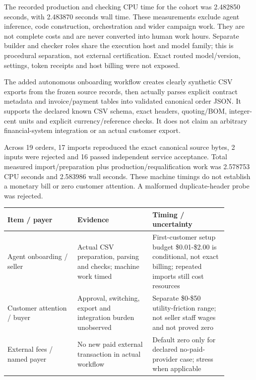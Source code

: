 \documentclass[10pt,letterpaper]{article}
\begin{document}
The recorded production and checking CPU time for the cohort was 2.482850 seconds, with 2.483870 seconds wall time. These measurements exclude agent inference, code construction, orchestration and wider campaign work. They are not complete costs and are never converted into human work hours. Separate builder and checker roles share the execution host and model family; this is procedural separation, not external certification. Exact routed model/version, settings, token receipts and host billing were not exposed.

The added autonomous onboarding workflow creates clearly synthetic CSV exports from the frozen source records, then actually parses explicit contract metadata and invoice/payment tables into validated canonical order JSON. It supports the declared known CSV schema, exact headers, quoting/BOM, integer-cent units and explicit currency/reference checks. It does not claim an arbitrary financial-system integration or an actual customer export.

Across 19 orders, 17 imports reproduced the exact canonical source bytes, 2 inputs were rejected and 16 passed independent service acceptance. Total measured import/preparation plus production/requalification work was 2.578753 CPU seconds and 2.583986 wall seconds. These machine timings do not establish a monetary bill or zero customer attention. A malformed duplicate-header probe was rejected.

\begin{longtable}{>{\raggedright\arraybackslash}p{0.280\linewidth}>{\raggedright\arraybackslash}p{0.300\linewidth}>{\raggedright\arraybackslash}p{0.300\linewidth}}
\toprule
\textbf{Item / payer} & \textbf{Evidence} & \textbf{Timing / uncertainty}\\
\midrule
\endhead
Agent onboarding / seller & Actual CSV preparation, parsing and checks; machine work timed & First-customer setup budget \$0.01-\$2.00 is conditional, not exact billing; repeated imports still cost resources\\
Customer attention / buyer & Approval, switching, export and integration burden unobserved & Separate \$0-\$50 utility-friction range; not seller staff wages and not proved zero\\
External fees / named payer & No new paid external transaction in actual workflow & Default zero only for declared no-paid-provider case; stress when applicable\\
\bottomrule
\end{longtable}
\end{document}

